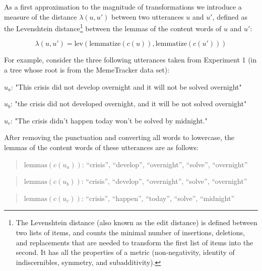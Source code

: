 As a first approximation to the magnitude of transformations we
introduce a measure of the distance \(\lambda(u, u')\) between two
utterances \(u\) and \(u'\), defined as the Levenshtein
distance\footnote{The Levenshtein distance (also known as the edit
  distance) is defined between two lists of items, and counts the
  minimal number of insertions, deletions, and replacements that are
  needed to transform the first list of items into the second. It has
  all the properties of a metric (non-negativity, identity of
  indiscernibles, symmetry, and subadditivity).} between the lemmas of
the content words of \(u\) and \(u'\):

\[\lambda(u, u') = \text{lev}\left(\text{lemmatize}(c(u)), \text{lemmatize}(c(u'))\right)\]

For example, consider the three following utterances taken from
Experiment 1 (in a tree whose root is from the MemeTracker data set):

\begin{nquote} %
  $u_a$: "This crisis did not develop overnight and it will not be solved overnight"
\end{nquote}\begin{nquote} %
  $u_b$: "the crisis did not developed overnight, and it will be not solved overnight"
\end{nquote}\begin{nquote} %
  $u_c$: "The crisis didn't happen today won't be solved by midnight."
\end{nquote}

After removing the punctuation and converting all words to lowercase,
the lemmas of the content words of these utterances are as follows:

\begin{quote}
\(\text{lemmas}(c(u_a))\): \enquote{crisis}, \enquote{develop},
\enquote{overnight}, \enquote{solve}, \enquote{overnight}
\end{quote}

\begin{quote}
\(\text{lemmas}(c(u_b))\): \enquote{crisis}, \enquote{develop},
\enquote{overnight}, \enquote{solve}, \enquote{overnight}
\end{quote}

\begin{quote}
\(\text{lemmas}(c(u_c))\): \enquote{crisis}, \enquote{happen},
\enquote{today}, \enquote{solve}, \enquote{midnight}
\end{quote}

